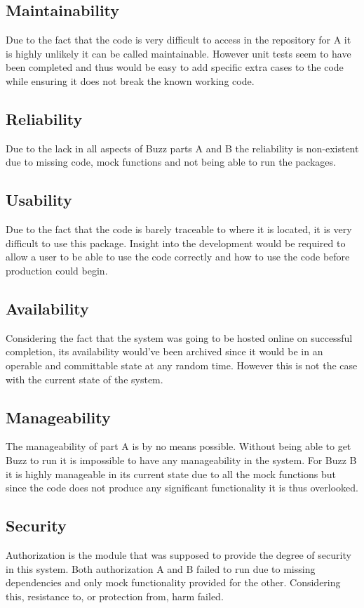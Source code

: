 \documentclass[12pt]{article}
\begin{document}
\subsection{Maintainability}
Due to the fact that the code is very difficult to access in the repository for A it is highly unlikely it can be called maintainable. However unit tests seem to have been completed and thus would be easy to add specific extra cases to the code while ensuring it does not break the known working code.
\subsection{Reliability}
Due to the lack in all aspects of Buzz parts A and B the reliability is non-existent due to missing code, mock functions and not being able to run the packages.
\subsection{Usability}
Due to the fact that the code is barely traceable to where it is located, it is very difficult to use this package. Insight into the development would be required to allow a user to be able to use the code correctly and how to use the code before production could begin.
\subsection{Availability}
Considering the fact that the system was going to be hosted online on successful completion, its availability would've been archived since it would be in an operable and committable state at any random time. However this is not the case with the current state of the system.

\subsection{Manageability}
The manageability of part A is by no means possible. Without being able to get Buzz to run it is impossible to have any manageability in the system. For Buzz B it is highly manageable in its current state due to all the mock functions but since the code does not produce any significant functionality it is thus overlooked.
\subsection{Security}
Authorization is the module that was supposed to provide the degree of security in this system. Both authorization A and B  failed to run due to missing dependencies and only mock functionality provided for the other. Considering this, resistance to, or protection from, harm failed.
\end{document}
